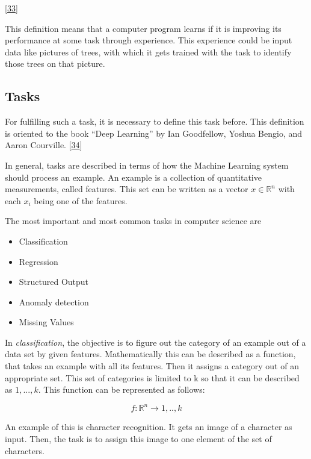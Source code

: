 \documentclass[12pt,english,a4paper,oneside,,tablecaptionabove]{scrbook}
\providecommand{\tightlist}{%
  \setlength{\itemsep}{0pt}\setlength{\parskip}{0pt}}
\begin{document}
{[}\protect\hyperlink{ref-Mitchell:1997:ML:541177}{33}{]}

This definition means that a computer program learns if it is improving
its performance at some task through experience. This experience could
be input data like pictures of trees, with which it gets trained with
the task to identify those trees on that picture.

\hypertarget{tasks}{%
\subsection{Tasks}\label{tasks}}

For fulfilling such a task, it is necessary to define this task before.
This definition is oriented to the book \enquote{Deep Learning} by Ian
Goodfellow, Yoshua Bengio, and Aaron Courville.
{[}\protect\hyperlink{ref-Goodfellow-et-al-2016}{34}{]}

In general, tasks are described in terms of how the Machine Learning
system should process an example. An example is a collection of
quantitative measurements, called features. This set can be written as a
vector \(x \in \mathbb{R}^n\) with each \(x_i\) being one of the
features.

The most important and most common tasks in computer science are

\begin{itemize}
\tightlist
\item
  Classification
\item
  Regression
\item
  Structured Output
\item
  Anomaly detection
\item
  Missing Values
\end{itemize}

In \emph{classification}, the objective is to figure out the category of
an example out of a data set by given features. Mathematically this can
be described as a function, that takes an example with all its features.
Then it assigns a category out of an appropriate set. This set of
categories is limited to k so that it can be described as \({1,...,k}\).
This function can be represented as follows:

\begin{equation}\label{eq:classification }

f: \mathbb{R}^n \rightarrow {1, .., k}

\end{equation}

An example of this is character recognition. It gets an image of a
character as input. Then, the task is to assign this image to one
element of the set of characters.
\end{document}
